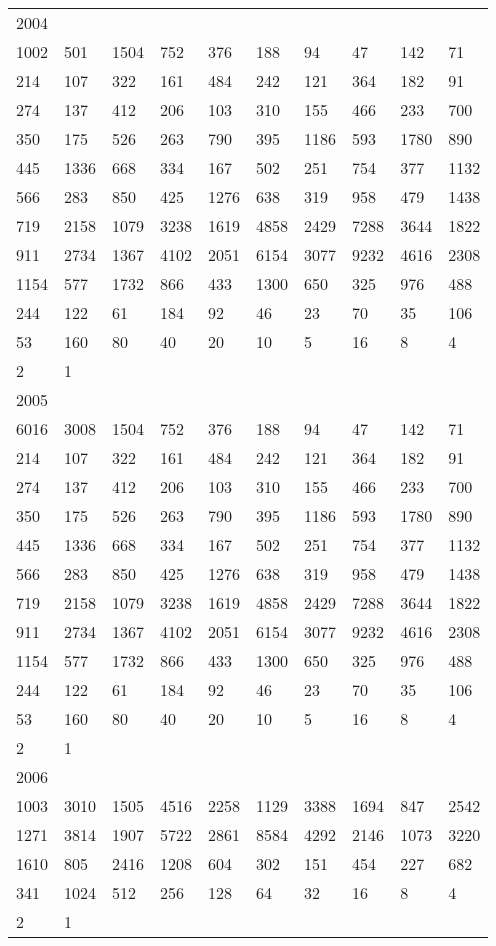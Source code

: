 \begin{longtable}{*{10}{l}}
2004&&&&&&&&&\\
1002& 501& 1504& 752& 376& 188& 94& 47& 142& 71\\
214& 107& 322& 161& 484& 242& 121& 364& 182& 91\\
274& 137& 412& 206& 103& 310& 155& 466& 233& 700\\
350& 175& 526& 263& 790& 395& 1186& 593& 1780& 890\\
445& 1336& 668& 334& 167& 502& 251& 754& 377& 1132\\
566& 283& 850& 425& 1276& 638& 319& 958& 479& 1438\\
719& 2158& 1079& 3238& 1619& 4858& 2429& 7288& 3644& 1822\\
911& 2734& 1367& 4102& 2051& 6154& 3077& 9232& 4616& 2308\\
1154& 577& 1732& 866& 433& 1300& 650& 325& 976& 488\\
244& 122& 61& 184& 92& 46& 23& 70& 35& 106\\
53& 160& 80& 40& 20& 10& 5& 16& 8& 4\\
2& 1& \\

2005&&&&&&&&&\\
6016& 3008& 1504& 752& 376& 188& 94& 47& 142& 71\\
214& 107& 322& 161& 484& 242& 121& 364& 182& 91\\
274& 137& 412& 206& 103& 310& 155& 466& 233& 700\\
350& 175& 526& 263& 790& 395& 1186& 593& 1780& 890\\
445& 1336& 668& 334& 167& 502& 251& 754& 377& 1132\\
566& 283& 850& 425& 1276& 638& 319& 958& 479& 1438\\
719& 2158& 1079& 3238& 1619& 4858& 2429& 7288& 3644& 1822\\
911& 2734& 1367& 4102& 2051& 6154& 3077& 9232& 4616& 2308\\
1154& 577& 1732& 866& 433& 1300& 650& 325& 976& 488\\
244& 122& 61& 184& 92& 46& 23& 70& 35& 106\\
53& 160& 80& 40& 20& 10& 5& 16& 8& 4\\
2& 1& \\

2006&&&&&&&&&\\
1003& 3010& 1505& 4516& 2258& 1129& 3388& 1694& 847& 2542\\
1271& 3814& 1907& 5722& 2861& 8584& 4292& 2146& 1073& 3220\\
1610& 805& 2416& 1208& 604& 302& 151& 454& 227& 682\\
341& 1024& 512& 256& 128& 64& 32& 16& 8& 4\\
2& 1& \\


\end{longtable}

